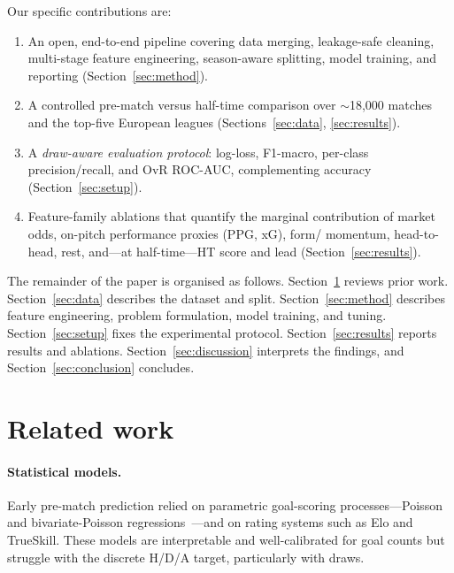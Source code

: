 \documentclass[pdflatex,sn-mathphys-num]{sn-jnl}
\theoremstyle{thmstyleone}
\theoremstyle{thmstyletwo}
\theoremstyle{thmstylethree}
\begin{document}
Our specific contributions are:
\begin{enumerate}
  \item An open, end-to-end pipeline covering data merging, leakage-safe
        cleaning, multi-stage feature engineering, season-aware
        splitting, model training, and reporting (Section~\ref{sec:method}).
  \item A controlled pre-match versus half-time comparison over
        $\sim$18,000 matches and the top-five European leagues
        (Sections~\ref{sec:data}, \ref{sec:results}).
  \item A \emph{draw-aware evaluation protocol}: log-loss, F1-macro,
        per-class precision/recall, and OvR ROC-AUC, complementing accuracy
        (Section~\ref{sec:setup}).
  \item Feature-family ablations that quantify the marginal contribution
        of market odds, on-pitch performance proxies (PPG, xG), form/
        momentum, head-to-head, rest, and---at half-time---HT score and lead
        (Section~\ref{sec:results}).
\end{enumerate}

The remainder of the paper is organised as follows.
Section~\ref{sec:related} reviews prior work.
Section~\ref{sec:data} describes the dataset and split.
Section~\ref{sec:method} describes feature engineering, problem formulation,
model training, and tuning.
Section~\ref{sec:setup} fixes the experimental protocol.
Section~\ref{sec:results} reports results and ablations.
Section~\ref{sec:discussion} interprets the findings, and
Section~\ref{sec:conclusion} concludes.

\section{Related work}\label{sec:related}

\paragraph{Statistical models.} Early pre-match prediction relied on
parametric goal-scoring processes---Poisson and bivariate-Poisson
regressions~\cite{bib3,bib4}---and on rating systems such as Elo and
TrueSkill. These models are interpretable and well-calibrated for
goal counts but struggle with the discrete \textsc{H/D/A} target,
particularly with draws.
\end{document}
